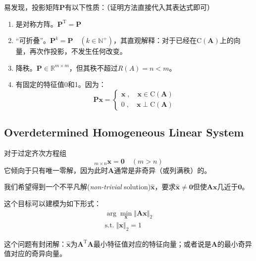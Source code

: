         易发现，投影矩阵$\bm{P}$有以下性质：（证明方法直接代入其表达式即可）
        \begin{enumerate}
            \item 是对称方阵。$\bm{P}^{\mathrm{T}}=\bm{P}$
            \item “可折叠”。$\bm{P}^k=\bm{P}\quad(k\in \mathbb{N}^+)$，其直观解释：对于已经在$\mathrm{C}(\bm{A})$上的向量，再次作投影，不发生任何改变。
            \item 降秩。$\bm{P}\in \mathbb{R}^{m\times m}$，但其秩不超过$R(A)=n<m$。
            \item 有固定的特征值0和1。因为：
                \begin{equation}
                    \bm{P}\bm{x}=
                    \left\{\begin{aligned}
                        \bm{x}\;,\quad \bm{x}\in \mathrm{C}(\bm{A})\\
                        0\;,\quad \bm{x}\perp \mathrm{C}(\bm{A})
                    \end{aligned}\right.
                \end{equation}
        \end{enumerate}


    \subsection{Overdetermined Homogeneous Linear System}
        对于过定齐次方程组
        \begin{equation}
            [\bm{A}]_{m\times n}\bm{x}=\bm{0} \quad(m> n)
        \end{equation}
        它倾向于只有唯一零解，因为此时$\bm{A}$通常是非奇异（或列满秩）的。

        我们希望得到一个不平凡解(\emph{non-trivial} solution)$\hat{\bm{x}}$，要求$\hat{\bm{x}}\neq \bm{0}$但使$\bm{A}\bm{x}$几近于$\bm{0}$。

        这个目标可以建模为如下形式：
        \begin{equation}
            \begin{aligned}
                \arg \mathop{\min}_{\bm{x}} \left\Vert \bm{A}\bm{x}\right\Vert_2\\
                \mathrm{s.t.}\; \left\Vert \bm{x}\right\Vert_2=1
            \end{aligned}
        \end{equation}

        这个问题有封闭解：$\hat{\bm{x}}$为$\bm{A}^{\mathrm{T}}\bm{A}$最小特征值对应的特征向量；或者说是$\bm{A}$的最小奇异值对应的奇异向量。

